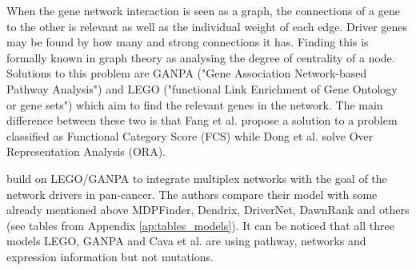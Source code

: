 


When the gene network interaction is seen as a graph, the connections of a gene to the other is relevant as well as the individual weight of each edge.  Driver genes may be found by how many and strong connections it has. Finding this is formally known in graph theory as analysing the degree of centrality of a node. Solutions to this problem are GANPA ("Gene Association Network-based Pathway Analysis")\cite{Fang2012-vr} and LEGO ("functional Link Enrichment of Gene Ontology or gene sets")\cite{Dong2016-zs} which aim to find the relevant genes in the network. The main difference between these two is that Fang et al. propose a solution to a problem classified as Functional Category Score (FCS) while Dong et al. solve Over Representation Analysis (ORA). 

\citet{Cava2018-rv} build on LEGO/GANPA to integrate multiplex networks with the goal of the network drivers in pan-cancer. The authors compare their model with some already mentioned above MDPFinder\cite{Zhao2012-wj}, Dendrix\cite{Vandin2012-cf}, DriverNet\cite{Bashashati2012-lk}, DawnRank\cite{Hou2014-se} and others (see tables from Appendix \cref{ap:tables_models}). It can be noticed that all three models LEGO, GANPA and Cava et al. are using pathway, networks and expression information but not mutations.


